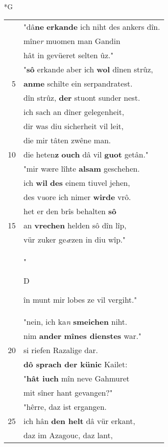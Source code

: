 \documentclass[8pt,a4paper,notitlepage]{article}
\begin{document}
\newpage
\begin{table}[ht]
\begin{minipage}[t]{0.5\linewidth}
\small
\begin{center}*G
\end{center}
\begin{tabular}{rl}
 & "dâ\textbf{ne} \textbf{erkande} ich niht des ankers dîn.\\ 
 & mîne\textit{r} muomen man Gandin\\ 
 & hât in gevüeret selten ûz."\\ 
 & "\textbf{sô} erkande aber ich \textbf{wol} dînen strûz,\\ 
5 & \textbf{anme} schilte ein serpandratest.\\ 
 & dîn strûz, \textbf{der} stuont sunder nest.\\ 
 & ich sach an dîner gelegenheit,\\ 
 & dir was diu sicherheit vil leit,\\ 
 & die mir tâten zwêne man.\\ 
10 & die heten\textbf{z} \textbf{ouch} dâ vil \textbf{guot} getân."\\ 
 & "mir wære lîhte \textbf{alsam} geschehen.\\ 
 & ich \textbf{wil} \textbf{des} einem tiuvel jehen,\\ 
 & des v\textit{u}ore ich nimer \textbf{wirde} vrô.\\ 
 & het er den brîs behalten \textbf{sô}\\ 
15 & an \textbf{vrechen} helden sô dîn lîp,\\ 
 & vür zuker ge\textit{æ}zen in diu wîp."\\ 
 & "\begin{large}D\end{large}în munt mir lobes ze vil vergiht."\\ 
 & "nein, ich ka\textit{n} \textbf{smeichen} niht.\\ 
 & nim \textbf{ander} \textbf{mînes dienstes} war."\\ 
20 & si riefen Razalige dar.\\ 
 & \textbf{dô sprach der künic} Kailet:\\ 
 & "\textbf{hât iuch} mîn neve Gahmuret\\ 
 & mit sîner hant gevangen?"\\ 
 & "hêrre, daz ist ergangen.\\ 
25 & ich hân \textbf{den helt} dâ vür erkant,\\ 
 & daz im Azagouc, daz lant,\\ 

\end{tabular}
\end{minipage}
\end{table}
\end{document}
